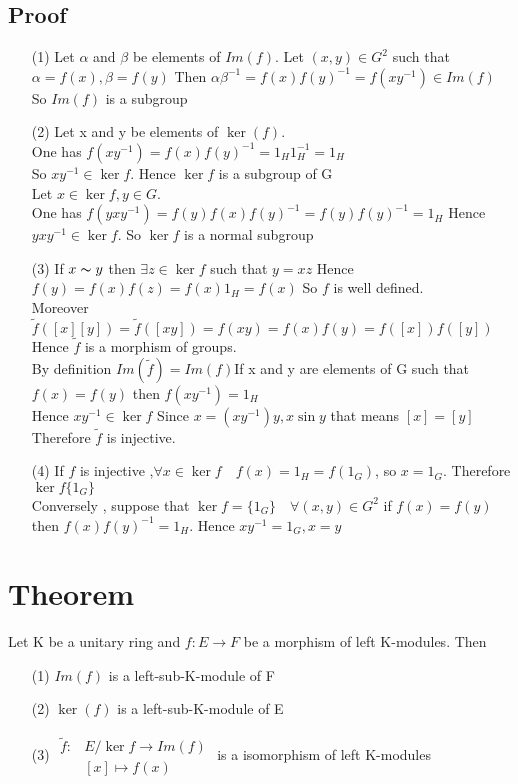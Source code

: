 \documentclass{book}
\begin{document}
\subsection{Proof}
\begin{itemize}
    \item[(1)] Let $\alpha$ and $ \beta$ be elements of $Im(f)$. Let $(x,y )\in G^2$ such that $\alpha =f(x),\beta=f(y)$ Then $\alpha\beta^{-1}=f(x)f(y)^{-1}=f(xy^{-1})\in Im(f)$ So $Im(f)$ is a subgroup
    \item[(2)] Let x and y be elements of $\ker (f)$. \\One has $f(xy^{-1}) = f(x)f(y)^{-1} = 1_H1_H^{-1} = 1_H$ \\So $xy^{-1}\in \ker f.$ Hence $\ker f$ is a subgroup of G\\Let $x\in \ker f,y\in G$. \\One has $f(yxy^{-1}) = f(y)f(x)f(y)^{-1} = f(y)f(y)^{-1} = 1_H$ Hence $yxy^{-1}\in \ker f$. So $\ker f$ is a normal subgroup
    \item[(3)] If $x\thicksim y$ then $\exists z\in \ker f $ such that $y=xz$ Hence $f(y)=f(x)f(z)=f(x)1_H=f(x)$ So $f$ is well defined. \\Moreover $\widetilde{f}([x][y])=\widetilde{f}([xy])=f(xy)=f(x)f(y)=f([x])f([y])$ Hence $\widetilde{f}$ is a morphism of groups.\\By definition $Im(\widetilde{f})=Im(f)$\quad If x and y are elements of G such that $f(x)=f(y)$ then $f(xy^{-1})=1_H$ \\Hence $xy^{-1}\in \ker f$ Since $x=(xy^{-1})y,x\sin y$ that means $[x]=[y]$ \\Therefore $\widetilde{f}$ is injective.
    \item[(4)] If $f$ is injective ,$\forall x\in \ker f\quad f(x)=1_H=f(1_G)$, so $x=1_G$. Therefore $\ker f\{1_G\}$ \\Conversely , suppose that $\ker f =\{1_G\}\quad \forall (x,y)\in G^2$ if $f(x)=f(y)$ then $f(x)f(y)^{-1}=1_H$. Hence $xy^{-1}=1_G, x=y$
\end{itemize}
\section{Theorem}
Let K be a unitary ring and $f:E\rightarrow F $ be a morphism of left K-modules. Then 
\begin{itemize}
    \item[(1)] $Im(f)$ is a left-sub-K-module of F
    \item[(2)] $\ker(f)$ is a left-sub-K-module of E
    \item[(3)] $\begin{aligned}
        \widetilde{f}:&E/\ker f\rightarrow Im (f)\\
        &[x]\mapsto f(x)
    \end{aligned}$ is a isomorphism of left K-modules
\end{itemize}
\end{document}
